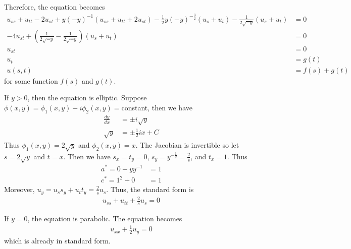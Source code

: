 \documentclass[12pt]{article}
\begin{document}
\begin{problem}[1.4.7]
Therefore, the equation becomes
\begin{align*}
u_{ss} + u_{tt} - 2u_{st} + y(-y)^{-1} (u_{ss}+u_{tt}+2u_{st})- \frac{1}{2} y (-y)^{-\frac{3}{2}} (u_s+u_t) -\frac{1}{2\sqrt{-y} }(u_s+u_t) &= 0 \\
-4u_{st} + \left(\frac{1}{ 2 \sqrt{-y}} - \frac{1}{2\sqrt{-y} } \right)(u_s+u_t)&= 0 \\
u_{st}&= 0 \\
u_t &= g(t) \\
u(s,t) &= f(s) + g(t) 
\end{align*}
for some function $ f(s)$ and  $ g(t)$.
\begin{case}[2]
If $ y>0$, then the equation is elliptic. Suppose  $ \phi(x,y) = \phi_1(x,y) + i\phi_2(x,y) =$constant, then we have
\begin{align*}
	\frac{d y}{d x} &= \pm i \sqrt{y}  \\
	\sqrt{y} &= \pm \frac{1}{2} i x +C  
\end{align*}
Thus $ \phi_1(x,y) = 2\sqrt{y} $ and $ \phi_2(x,y) = x$. The Jacobian is invertible so let $ s = 2\sqrt{y} $ and $ t = x$. Then we have  $ s_x = t_y = 0$,  $ s_y = y^{-\frac{1}{2}} = \frac{2}{s}$, and $ t_x = 1$. Thus
 \begin{align*}
	a^*  = 0 + y y^{-1} &= 1 \\
	c^* = 1^2+0 &= 1 
\end{align*}
Moreover, $ u_y = u_s s_y+u_t t_y = \frac{2}{s} u_s$. Thus, the standard form is
\begin{align*}
	u_{ss} + u_{tt} + \frac{2}{s}u_s = 0
\end{align*}
\end{case}
\begin{case}[3]
If $ y = 0$, the equation is parabolic. The equation becomes
\begin{align*}
	u_{x x} + \frac{1}{2}u_y =0
\end{align*}
which is already in standard form.
\end{case}
\end{problem}
\end{document}
